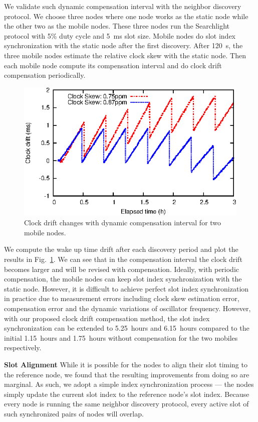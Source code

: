 \documentclass[twoside,twocolumn]{article}
\begin{document}
We validate such dynamic compensation interval with the neighbor discovery
protocol. We choose three nodes where one node works as the static node while 
the other two as the mobile nodes. These three nodes run the Searchlight 
protocol with 5\% duty cycle and 5~ms slot size. Mobile nodes do slot index 
synchronization with the static node after the first discovery. After 120~s, 
the three mobile nodes estimate the relative clock skew with the static node. 
Then each mobile node compute its compensation interval and do clock drift
compensation periodically.

\begin{figure}[t]
   \centering
   \includegraphics{graphs/clock-compensation-result/compensate-effect}
   \caption{Clock drift changes with dynamic compensation interval for two mobile nodes.}
   \label{fig:compensation}
\end{figure}

We compute the wake up time drift after each discovery period and plot the
results in Fig.~\ref{fig:compensation}. We can see that in the compensation 
interval the clock drift becomes larger and will be revised with compensation. 
Ideally, with periodic compensation, the mobile nodes can keep slot index 
synchronization with the static node. However, it is difficult to achieve 
perfect slot index synchronization in practice due to measurement errors 
including clock skew estimation error, compensation error and the dynamic 
variations of oscillator frequency. However, with our proposed clock drift 
compensation method, the slot index synchronization can be extended to 
5.25~hours and 6.15~hours compared to the initial 1.15~hours and 1.75~hours 
without compensation for the two mobiles respectively.

{\bf Slot Alignment} While it is possible for the nodes to align their
slot timing to the reference node, we found that the resulting
improvements from doing so are marginal. As such, we adopt a simple
index synchronization process --- the nodes simply update the current
slot index to the reference node's slot index. Because every node is
running the same neighbor discovery protocol, every active slot of
such synchronized pairs of nodes will overlap.
\end{document}
